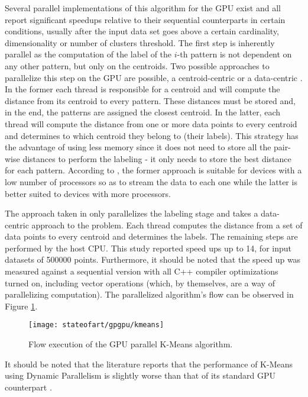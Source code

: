 Several parallel implementations of this algorithm for the GPU exist \cite{Bai2009, Wu2011, Zechner2009, Sirotkovi2012, Farivar2008} and all report significant speedups relative to their sequential counterparts in certain conditions, usually after the input data set goes above a certain cardinality, dimensionality or number of clusters threshold.
The first step is inherently parallel as the computation of the label of the $i$-th pattern is not dependent on any other pattern, but only on the centroids.
Two possible approaches to parallelize this step on the GPU are possible, a centroid-centric or a data-centric \cite{Bai2009}.
In the former each thread is responsible for a centroid and will compute the distance from its centroid to every pattern.
These distances must be stored and, in the end, the patterns are assigned the closest centroid.
In the latter, each thread will compute the distance from one or more data points to every centroid and determines to which centroid they belong to (their labels).
This strategy has the advantage of using less memory since it does not need to store all the pair-wise distances to perform the labeling - it only needs to store the best distance for each pattern.
According to \cite{Bai2009}, the former approach is suitable for devices with a low number of processors so as to stream the data to each one while the latter is better suited to devices with more processors.

The approach taken in \cite{Zechner2009b} only parallelizes the labeling stage and takes a data-centric approach to the problem.
Each thread computes the distance from a set of data points to every centroid and determines the labels.
The remaining steps are performed by the host CPU.
This study reported speed ups up to 14, for input datasets of 500000 points.
Furthermore, it should be noted that the speed up was measured against a sequential version with all C++ compiler optimizations turned on, including vector operations (which, by themselves, are a way of parallelizing computation).
The parallelized algorithm's flow can be observed in Figure \ref{fig:kmeans}.

\begin{figure}[hbtp]
	\centering
	\texttt{[image: stateofart/gpgpu/kmeans]}
	\caption{Flow execution of the GPU parallel K-Means algorithm.}
	\label{fig:kmeans}
\end{figure}

It should be noted that the literature reports that the performance of K-Means using Dynamic Parallelism is slightly worse than that of its standard GPU counterpart \cite{DiMarco2013}.

